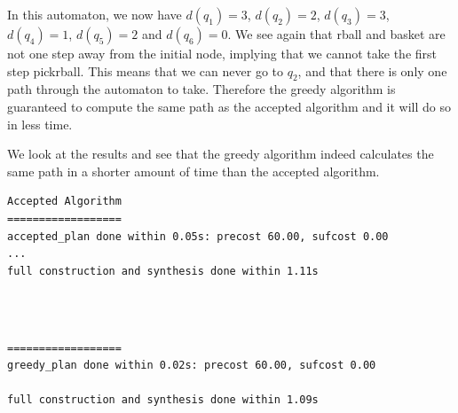 In this automaton, we now have $d(q_1)=3$, $d(q_2)=2$, $d(q_3)=3$, $d(q_4)=1$, $d(q_5) = 2$ and $d(q_6)=0$. We see again that rball and basket are not one step away from the initial node, implying that we cannot take the first step pickrball. This means that we can never go to $q_2$, and that there is only one path through the automaton to take. Therefore the greedy algorithm is guaranteed to compute the same path as the accepted algorithm and it will do so in less time.

We look at the results and see that the greedy algorithm indeed calculates the same path in a shorter amount of time than the accepted algorithm. \\


\begin{minipage}{\textwidth}
\begingroup
\fontsize{9pt}{12pt}\selectfont
\begin{lstlisting}
Accepted Algorithm
==================
accepted_plan done within 0.05s: precost 60.00, sufcost 0.00
...
full construction and synthesis done within 1.11s 
\end{lstlisting}
\endgroup
\end{minipage} \\ \\



\begin{minipage}{\textwidth}
\begingroup
\fontsize{9pt}{12pt}\selectfont
\begin{lstlisting}
==================
greedy_plan done within 0.02s: precost 60.00, sufcost 0.00

full construction and synthesis done within 1.09s 
\end{lstlisting}
\endgroup
\end{minipage} \\ \\


